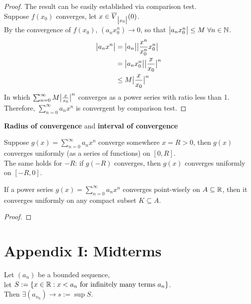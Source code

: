 \documentclass[11pt]{article}
\begin{document}
 	\begin{proof}
 		The result can be easily established via comparison test. \\
 		Suppose $f(x_0)$ converges, let $x \in \overline{V}_{\big \vert {x_0} \big \vert}(0)$. \\
 		By the convergence of $f(x_0)$, $(a_n x_0^n) \to 0$, so that $\big \vert {a_n x_0^n} \big \vert \leq M\ \forall n \in \mathbb{N}$.
 		\begin{align}
 			\big \vert {a_n x^n} \big \vert &= \big \vert {a_n} \big \vert \big \vert {\frac{x^n}{x_0^n} x_0^n} \big \vert \\
 			&= \big \vert {a_n x_0^n} \big \vert \big \vert {\frac{x}{x_0}} \big \vert^n \\
 			&\leq M \big \vert {\frac{x}{x_0}} \big \vert^n 
 		\end{align}
 		In which $\sum_{n=0}^\infty M \big \vert {\frac{x}{x_0}} \big \vert^n$ converges as a power series with ratio less than 1. \\
 		Therefore, $\sum_{n=0}^\infty a_n x^n$ is convergent by comparison test.
 	\end{proof}
 	
 	\begin{definition}
 		\textbf{Radius of convergence} and \textbf{interval of convergence}
 	\end{definition}
 	
 	\begin{theorem}
 		Suppose $g(x) = \sum_{n=0}^\infty a_n x^n$ converge somewhere $x = R > 0$, then $g(x)$ converges uniformly (as a series of functions) on $[0, R]$. \\
 		The same holds for $-R$: if $g(-R)$ converges, then $g(x)$ converges uniformly on $[-R, 0]$.
 	\end{theorem}
 	
 	\begin{theorem}
 		If a power series $g(x) = \sum_{n=0}^\infty a_n x^n$ converges point-wisely on $A \subseteq \mathbb{R}$, then it converges uniformly on any compact subset $K \subseteq A$.
 	\end{theorem}
 	
 	\begin{proof}
 	\end{proof}

 	\newpage
 	\section{Appendix I: Midterms}
 	\begin{proposition}[Midterm 1, Q7]
 		Let $(a_n)$ be a bounded sequence,\\
 		let $S:= \{x \in \mathbb{R}: x < a_n \text{{ for infinitely many terms }}a_n\}$. \\
 		Then $\exists (a_{n_k}) \to s := \sup S$.
 	\end{proposition}
 	
\end{document}
